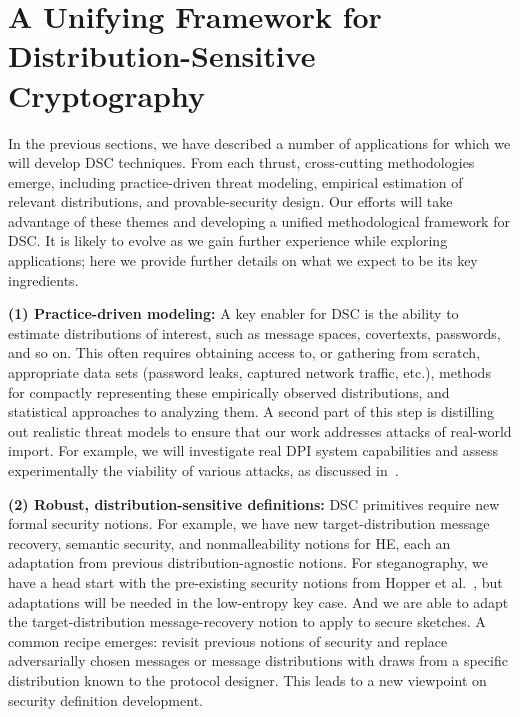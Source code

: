 \section{A Unifying Framework for Distribution-Sensitive Cryptography}



In the previous sections, we have described a number of applications for which we
will develop DSC techniques. From each thrust, cross-cutting methodologies
emerge, including practice-driven threat modeling, empirical estimation of
relevant distributions, and provable-security design. Our
efforts will take advantage of these themes and developing a unified
methodological framework for DSC. 
It is likely to evolve as we gain further experience while exploring
applications; here we provide further details on what we expect to be its key
ingredients.

\vspace{2mm}
\noindent \textbf{(1) Practice-driven modeling:} A key enabler for DSC is the ability to
estimate distributions of interest, such as message spaces, covertexts, passwords, and so on. This often requires obtaining access to, or
gathering from scratch, appropriate data sets (password leaks, captured network
traffic, etc.), methods for compactly representing these empirically observed
distributions, and statistical approaches to analyzing them. A second part of
this step is distilling out realistic threat models to ensure that our work
addresses attacks of real-world import. For example, we will investigate real
DPI system capabilities and assess experimentally the viability of various
attacks, as discussed in~.


\vspace{2mm}
\noindent \textbf{(2) Robust, distribution-sensitive definitions:} DSC primitives require
new formal security notions. For example, we have new target-distribution
message recovery, semantic security, and nonmalleability notions for HE, each an
adaptation from previous distribution-agnostic notions.
For steganography, we have a head start with the pre-existing security
notions from Hopper et al.~\cite{Hopper:Provable_Stego}, but 
adaptations will be needed in the low-entropy key case. 
And we are able to adapt
the target-distribution message-recovery notion to apply to secure sketches. 
A common recipe emerges: revisit previous notions of security and replace
adversarially chosen messages or message distributions with draws from a
specific distribution known to the protocol designer. This leads to a new
viewpoint on security definition development. 


